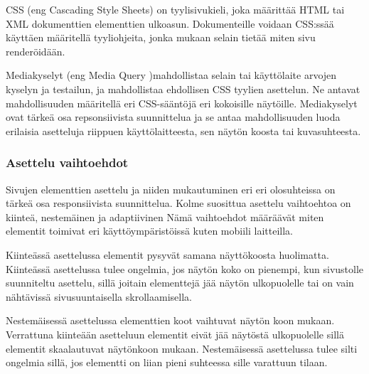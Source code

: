 \documentclass[11pt,a4paper,titlepage,oneside]{article}
\begin{document}

CSS (eng Cascading Style Sheets) on tyylisivukieli, joka määrittää HTML tai XML dokumenttien elementtien ulkoasun.
Dokumenteille voidaan CSS:ssää käyttäen määritellä tyyliohjeita, jonka mukaan selain tietää miten sivu renderöidään.
\medskip




Mediakyselyt (eng Media Query )mahdollistaa selain tai käyttölaite arvojen kyselyn ja testailun,
ja mahdollistaa ehdollisen CSS tyylien asettelun.
Ne antavat mahdollisuuden määritellä eri CSS-sääntöjä eri kokoisille näytöille. 
Mediakyselyt ovat tärkeä osa repsonsiivista suunnittelua ja se antaa mahdollisuuden luoda erilaisia asetteluja riippuen käyttölaitteesta,
sen näytön koosta tai kuvasuhteesta.












\subsubsection{Asettelu vaihtoehdot}





Sivujen elementtien asettelu ja niiden mukautuminen eri eri olosuhteissa on tärkeä osa responsiivista suunnittelua.
Kolme suosittua asettelu vaihtoehtoa on kiinteä, nestemäinen ja adaptiivinen
Nämä vaihtoehdot määräävät miten elementit toimivat eri käyttöympäristöissä kuten mobiili laitteilla.
\medskip



Kiinteässä asettelussa elementit pysyvät samana näyttökoosta huolimatta. 
Kiinteässä asettelussa tulee ongelmia, jos näytön koko on pienempi, kun sivustolle suunniteltu asettelu, 
sillä joitain elementtejä jää näytön ulkopuolelle tai on vain nähtävissä sivusuuntaisella skrollaamisella.
\medskip


Nestemäisessä asettelussa elementtien koot vaihtuvat näytön koon mukaan. 
Verrattuna kiinteään asetteluun elementit eivät jää näytöstä ulkopuolelle sillä elementit skaalautuvat näytönkoon mukaan.
Nestemäisessä asettelussa tulee silti ongelmia sillä, jos elementti on liian pieni suhteessa sille varattuun tilaan.
\medskip
\end{document}
